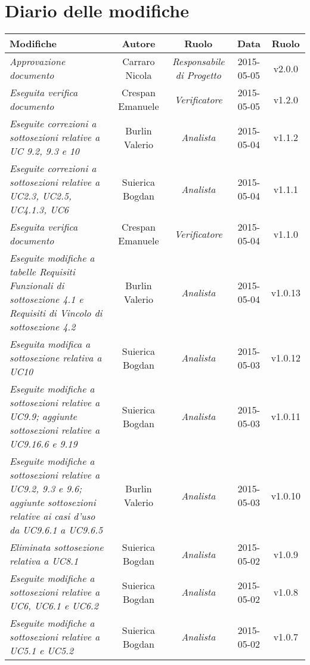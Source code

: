 \newpage
\section*{Diario delle modifiche}

\begin{table}[h]
\centering
\begin{tabular}{|p{}|c|c|c|c|}
	\toprule
		\textbf{Modifiche} & \textbf{Autore} & \textbf{Ruolo} & \textbf{Data} & \textbf{Ruolo} \\
	\midrule
	\midrule
		\textit{Approvazione documento} & Carraro Nicola & \textit{Responsabile di Progetto} & 2015-05-05 & v2.0.0 \\
	\midrule
		\textit{Eseguita verifica documento} & Crespan Emanuele & \textit{Verificatore} & 2015-05-05 & v1.2.0 \\
	\midrule
		\textit{Eseguite correzioni a sottosezioni relative a UC 9.2, 9.3 e 10} & Burlin Valerio & \textit{Analista} & 2015-05-04 & v1.1.2 \\
	\midrule
		\textit{Eseguite correzioni a sottosezioni relative a UC2.3, UC2.5, UC4.1.3, UC6} & Suierica Bogdan & \textit{Analista} & 2015-05-04 & v1.1.1 \\
	\midrule
		\textit{Eseguita verifica documento} & Crespan Emanuele & \textit{Verificatore} & 2015-05-04 & v1.1.0 \\
	\midrule
		\textit{Eseguite modifiche a tabelle Requisiti Funzionali di sottosezione 4.1 e Requisiti di Vincolo di sottosezione 4.2} & Burlin Valerio & \textit{Analista} & 2015-05-04 & v1.0.13 \\
	\midrule
		\textit{Eseguita modifica a sottosezione relativa a UC10} & Suierica Bogdan & \textit{Analista} & 2015-05-03 & v1.0.12 \\ 
	\midrule
		\textit{Eseguite modifiche a sottosezioni relative a UC9.9; aggiunte sottosezioni relative a UC9.16.6 e 9.19} & Suierica Bogdan & \textit{Analista} & 2015-05-03 & v1.0.11 \\ 
	\midrule
		\textit{Eseguite modifiche a sottosezioni relative a UC9.2, 9.3 e 9.6; aggiunte sottosezioni relative ai casi d'uso da UC9.6.1 a UC9.6.5} & Burlin Valerio & \textit{Analista} & 2015-05-03 & v1.0.10 \\
	\midrule
		\textit{Eliminata sottosezione relativa a UC8.1} & Suierica Bogdan & \textit{Analista} & 2015-05-02 & v1.0.9 \\
	\midrule
		\textit{Eseguite modifiche a sottosezioni relative a UC6, UC6.1 e UC6.2} & Suierica Bogdan & \textit{Analista} & 2015-05-02 & v1.0.8 \\
	\midrule
		\textit{Eseguite modifiche a sottosezioni relative a UC5.1 e UC5.2} & Suierica Bogdan & \textit{Analista} & 2015-05-02 & v1.0.7 \\
	\bottomrule
\end{tabular}	
\end{table}
